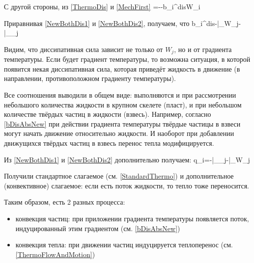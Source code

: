 \documentclass[main.tex]{subfiles}
\begin{document}
С другой стороны, из \eqref{ThermoDis} и \eqref{MechFirst}
\beq\label{NewBothDis2}
\delta=--b_i^{dis}W_i
\eeq

Приравнивая \eqref{NewBothDis1} и \eqref{NewBothDis2}, получаем, что
\beq\label{bDisAbsNew}
b_i^{dis}\approx-\bigg|_{}W_j-\bigg|_{}\nabla_j\theta
\eeq

Видим, что диссипативная сила зависит не только от $W_j$, но и от градиента температуры. Если будет градиент температуры, то возможна ситуация, в которой появится некая диссипативная сила, которая приведёт жидкость в движение (в направлении, противоположном градиенту температуры).

Все соотношения выводили в общем виде: выполняются и при рассмотрении небольшого количества жидкости в крупном скелете (пласт), и при небольшом количестве твёрдых частиц в жидкости (взвесь). Например, согласно \eqref{bDisAbsNew} при действии градиента температуры твёрдые частицы в взвеси могут начать движение относительно жидкости. И наоборот при добавлении движущихся твёрдых частиц в взвесь перенос тепла модифицируется.

Из \eqref{NewBothDis1} и \eqref{NewBothDis2} дополнительно получаем:
\beq\label{ThermoFlowAndMotion}
q_i=-\theta\cdot{}\bigg|_{}\nabla_j\theta-\theta\cdot{}\bigg|_{}W_j
\eeq

Получили стандартное слагаемое (см. \eqref{StandardThermo}) и дополнительное (конвективное) слагаемое: если есть поток жидкости, то тепло тоже переносится.

Таким образом, есть 2 разных процесса:
\begin{itemize}
	\item конвекция частиц: при приложении градиента температуры появляется поток, индуцированный этим градиентом (см. \eqref{bDisAbsNew})
	\item конвекция тепла: при движении частиц индуцируется теплоперенос (см. \eqref{ThermoFlowAndMotion})
\end{itemize}
\end{document}
